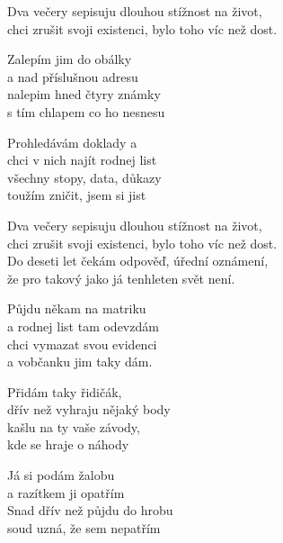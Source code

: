 
Dva večery sepisuju dlouhou stížnost na život,\\
chci zrušit svoji existenci, bylo toho víc než dost.

\ve{}
Zalepím jim do obálky\\
a nad příslušnou adresu\\
nalepim hned čtyry známky\\
s tím chlapem co ho nesnesu

\ve{}
Prohledávám doklady a\\
chci v nich najít rodnej list\\
všechny stopy, data, důkazy\\
toužím zničit, jsem si jist

\cho{}
Dva večery sepisuju dlouhou stížnost na život,\\
chci zrušit svoji existenci, bylo toho víc než dost.\\
Do deseti let čekám odpověď, úřední oznámení,\\
že pro takový jako já tenhleten svět není.

\ve{}
Půjdu někam na matriku\\
a rodnej list tam odevzdám\\
chci vymazat svou evidenci\\
a vobčanku jim taky dám.

\ve{}
Přidám taky řidičák,\\
dřív než vyhraju nějaký body\\
kašlu na ty vaše závody,\\
kde se hraje o náhody

\cho{}

\ve{}
Já si podám žalobu\\
a razítkem ji opatřím\\
Snad dřív než půjdu do hrobu\\
soud uzná, že sem nepatřím

\cho{}


\esong